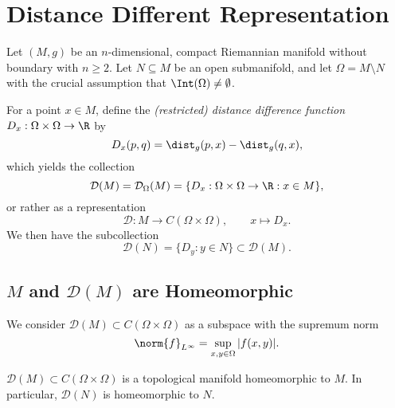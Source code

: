 


\section{Distance Different Representation}


Let $(M,g)$ be an $n$-dimensional, compact Riemannian manifold without boundary with $n\geq 2$.  Let $N\subseteq M$ be an open submanifold, and let $\Omega=M\setminus N$ with the crucial assumption that $\Int(\Omega)\neq\emptyset$.

For a point $x\in M$, define the \textit{(restricted) distance difference function} $D_x:\Omega\times\Omega\to\R$ by
$$D_x(p,q)=\dist_g(p,x)-\dist_g(q,x),$$
which yields the collection
$$\mathcal{D}(M)=\mathcal{D}_\Omega(M)=\{D_x:\Omega\times\Omega\to\R:x\in M\},$$
or rather as a representation
$$\mathcal{D}:M\to C(\Omega\times\Omega),\qquad x\mapsto D_x.$$
We then have the subcollection
$$\mathcal{D}(N)=\{D_y:y\in N\}\subset\mathcal{D}(M).$$




\subsection{$M$ and $\mathcal{D}(M)$ are Homeomorphic}

We consider $\mathcal{D}(M)\subset C(\Omega\times\Omega)$ as a subspace with the supremum norm 
$$\norm{f}_{L^\infty}=\sup_{x,y\in\Omega}|f(x,y)|.$$

\begin{thm}
    $\mathcal{D}(M)\subset C(\Omega\times\Omega)$ is a topological manifold homeomorphic to $M$.  In particular,  $\mathcal{D}(N)$ is homeomorphic to $N$.
    
\end{thm}

